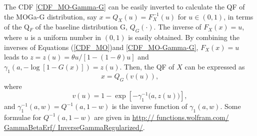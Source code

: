 \documentclass[twoside,leqno,11pt]{article}
\begin{document}
\vspace{0.6cm}

The CDF \eqref{CDF_MO-Gamma-G} can be easily inverted to calculate the QF of the MOGa-G distribution,
say $x=Q_{X}(u)=F_X^{-1}(u)$ for $u \in (0,1)$, in terms of the Q$_F$ of the baseline distribution G, $Q_G(\cdot)$. The inverse of
$F_{X}(x)=u$, where $u$ is a uniform number in $(0,1)$ is easily obtained. By combining the inverses
of Equations (\ref{CDF_MO})and \eqref{CDF_MO-Gamma-G}, $F_{X}(x)=u$ leads to
$z=z(u)=\theta u/[1-(1-\theta)u]$ and $\gamma_{1}\left(a, -\log[1-G(x)]\right)=z(u)$.
Then, the QF of $X$ can be expressed as
$$x=Q_G\left(v(u)\right),$$
where
$$v(u)=1-\exp\left[-\gamma_1^{-1}\big(a,z(u)\big)\right],$$
and $\gamma_1^{-1}(a,w)=Q^{-1}(a,1-w)$ is the inverse function of $\gamma_1(a,w)$. Some formulae for
$Q^{-1}(a,1-w)$ are given in \url{http:// functions.wolfram.com/ GammaBetaErf/ InverseGammaRegularized/}.
\end{document}
